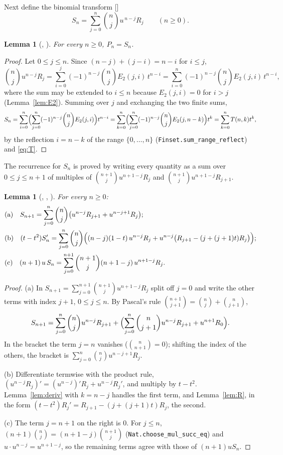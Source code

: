 \documentclass[11pt]{amsart}
\theoremstyle{plain}
\newtheorem{lemma}[theorem]{Lemma}
\theoremstyle{definition}
\newcommand{\Et}{E_2}
\begin{document}
Next define the binomial transform []
\[
  S_n=\sum_{j=0}^{n}\binom nj u^{\,n-j}R_j\qquad(n\ge0).
\]

\begin{lemma}[, ]\label{lem:PS}
For every $n\ge0$, $P_n=S_n$.
\end{lemma}

\begin{proof}
Let $0\le j\le n$. Since $(n-j)+(j-i)=n-i$ for $i\le j$,
\[
  \binom nj u^{n-j}R_j=\sum_{i=0}^{j}(-1)^{n-j}\binom nj\Et(j,i)\,t^{n-i}=\sum_{i=0}^{n}(-1)^{n-j}\binom nj\Et(j,i)\,t^{n-i},
\]
where the sum may be extended to $i\le n$ because $\Et(j,i)=0$ for $i>j$ (Lemma~\ref{lem:E2}). Summing over $j$ and exchanging the two finite sums,
\[
  S_n=\sum_{i=0}^{n}\Bigl(\sum_{j=0}^{n}(-1)^{n-j}\binom nj\Et(j,i)\Bigr)t^{n-i}
     =\sum_{k=0}^{n}\Bigl(\sum_{j=0}^{n}(-1)^{n-j}\binom nj\Et(j,n-k)\Bigr)t^{k}=\sum_{k=0}^{n}T(n,k)t^k,
\]
by the reflection $i=n-k$ of the range $\{0,\dots,n\}$ (\texttt{Finset.sum\_range\_reflect}) and \eqref{eq:T}.
\end{proof}

The recurrence for $S_n$ is proved by writing every quantity as a sum over $0\le j\le n+1$ of multiples of $\binom{n+1}{j}u^{n+1-j}R_j$ and $\binom{n+1}{j}u^{n+1-j}R_{j+1}$.

\begin{lemma}[, , ]\label{lem:S3}
For every $n\ge0$:
\begin{align*}
  &\text{(a)}\quad S_{n+1}=\sum_{j=0}^{n}\binom nj\bigl(u^{n-j}R_{j+1}+u^{n-j+1}R_j\bigr);\\
  &\text{(b)}\quad (t-t^2)S_n'=\sum_{j=0}^{n}\binom nj\Bigl((n-j)(1-t)\,u^{n-j}R_j+u^{n-j}\bigl(R_{j+1}-(j+(j+1)t)R_j\bigr)\Bigr);\\
  &\text{(c)}\quad (n+1)\,u\,S_n=\sum_{j=0}^{n+1}\binom{n+1}{j}(n+1-j)\,u^{n+1-j}R_j .
\end{align*}
\end{lemma}

\begin{proof}
(a) In $S_{n+1}=\sum_{j=0}^{n+1}\binom{n+1}{j}u^{n+1-j}R_j$ split off $j=0$ and write the other terms with index $j+1$, $0\le j\le n$. By Pascal's rule $\binom{n+1}{j+1}=\binom nj+\binom n{j+1}$,
\[
  S_{n+1}=\sum_{j=0}^{n}\binom nj u^{n-j}R_{j+1}+\Bigl(\sum_{j=0}^{n}\binom n{j+1}u^{n-j}R_{j+1}+u^{n+1}R_0\Bigr).
\]
In the bracket the term $j=n$ vanishes ($\binom n{n+1}=0$); shifting the index of the others, the bracket is $\sum_{j=0}^{n}\binom nj u^{n-j+1}R_j$.

(b) Differentiate termwise with the product rule, $(u^{n-j}R_j)'=(u^{n-j})'R_j+u^{n-j}R_j'$, and multiply by $t-t^2$. Lemma~\ref{lem:deriv} with $k=n-j$ handles the first term, and Lemma~\ref{lem:R}, in the form $(t-t^2)R_j'=R_{j+1}-(j+(j+1)t)R_j$, the second.

(c) The term $j=n+1$ on the right is $0$. For $j\le n$, $(n+1)\binom nj=(n+1-j)\binom{n+1}j$ (\texttt{Nat.choose\_mul\_succ\_eq}) and $u\cdot u^{n-j}=u^{n+1-j}$, so the remaining terms agree with those of $(n+1)uS_n$.
\end{proof}
\end{document}
